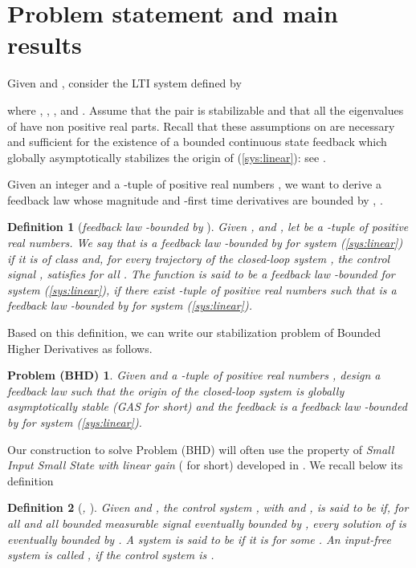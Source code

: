 \documentclass[letterpaper, 10pt]{article}
\newtheorem{defi}{Definition}
\newtheorem*{pb}{Problem (BHD)}
\newcommand{\rref}[1]{(\ref{#1})}
\begin{document}
\section{Problem statement and main results}\label{sec: main}


Given  and ,  consider the LTI system defined by

where , , , and . Assume that the pair  is stabilizable and that all the eigenvalues of  have non positive real parts. Recall that these assumptions on  are necessary and sufficient for the existence of a bounded continuous state feedback  which globally asymptotically stabilizes the origin of (\ref{sys:linear}): see \cite{SSY}. 

Given an integer  and a -tuple of positive real numbers , we want to derive a feedback law whose magnitude and -first time derivatives are bounded by , .
\begin{defi}[\emph{feedback law -bounded by }]
Given ,  and , let  be a -tuple of positive real numbers. We say that  is a \emph{feedback law -bounded by   for system \rref{sys:linear}} if it is of class  and, for every trajectory of the closed-loop system , the control signal ,  satisfies  for all . The function  is said to be a feedback law -bounded for system \rref{sys:linear}, if there exist -tuple of positive real numbers  such that  is a feedback law -bounded by   for system \rref{sys:linear}.
\end{defi}

Based on this definition, we can write our stabilization problem of Bounded Higher Derivatives as follows.
\begin{pb}
Given  and a -tuple of positive real numbers , design a feedback law  such that the origin of the closed-loop system  is globally asymptotically stable (GAS for short) and the feedback  is a feedback law -bounded by  for system \rref{sys:linear}.
\end{pb}

Our construction to solve Problem (BHD) will often use the property of \textit{Small Input Small State with linear gain} ( for short) developed in \cite{SSY}. We recall below its definition



\begin{defi}[\emph{, \cite{SSY}}]
Given  and , the control system , with  and , is said to be \emph{} if, for all  and all bounded measurable signal   eventually bounded by , every solution of  is eventually bounded by .
A system is said to be \emph{} if it is  for some . An input-free system  is called , if the control system  is . 
\end{defi}
 
\end{document}
